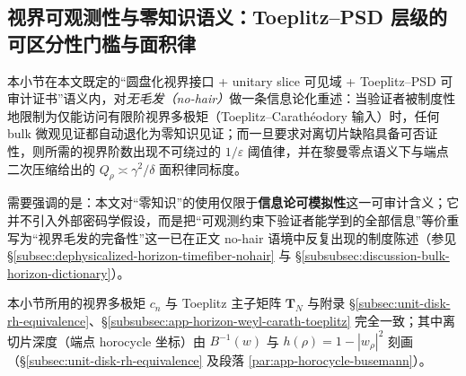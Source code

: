 \subsection{视界可观测性与零知识语义：Toeplitz--PSD 层级的可区分性门槛与面积律}\label{subsec:discussion-horizon-zk-toeplitz-area-law}
本小节在本文既定的“圆盘化视界接口 + unitary slice 可见域 + Toeplitz--PSD 可审计证书”语义内，对\emph{无毛发（no-hair）}做一条信息论化重述：当验证者被制度性地限制为仅能访问有限阶视界多极矩（Toeplitz--Carath\'eodory 输入）时，任何 bulk 微观见证都自动退化为零知识见证；而一旦要求对离切片缺陷具备可否证性，则所需的视界阶数出现不可绕过的 \(1/\varepsilon\) 阈值律，并在黎曼零点语义下与端点二次压缩给出的 \(Q_\rho\asymp \gamma^2/\delta\) 面积律同标度。
\par
需要强调的是：本文对“零知识”的使用仅限于\textbf{信息论可模拟性}这一可审计含义；它并不引入外部密码学假设，而是把“可观测约束下验证者能学到的全部信息”等价重写为“视界毛发的完备性”这一已在正文 no-hair 语境中反复出现的制度陈述（参见 \S\ref{subsec:dephysicalized-horizon-timefiber-nohair} 与 \S\ref{subsubsec:discussion-bulk-horizon-dictionary}）。
\par
本小节所用的视界多极矩 \(c_n\) 与 Toeplitz 主子矩阵 \(\mathbf{T}_N\) 与附录 \S\ref{subsec:unit-disk-rh-equivalence}、\S\ref{subsubsec:app-horizon-weyl-carath-toeplitz} 完全一致；其中离切片深度（端点 horocycle 坐标）由 \(B^{-1}(w)\) 与 \(h(\rho)=1-|w_\rho|^2\) 刻画（\S\ref{subsec:unit-disk-rh-equivalence} 及段落 \ref{par:app-horocycle-busemann}）。
\par

